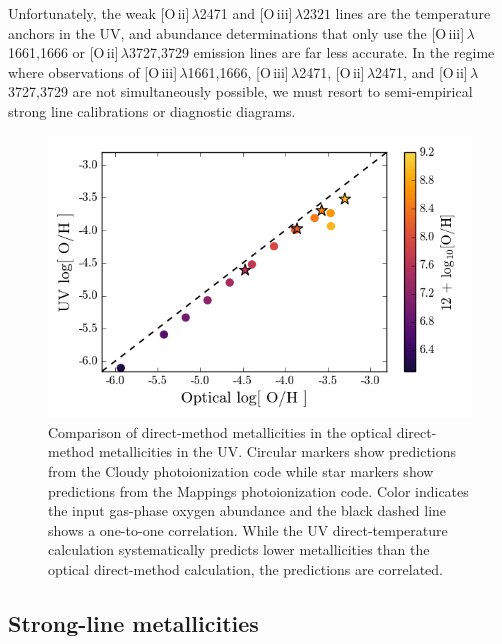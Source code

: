 \documentclass[preprint2]{aastex62}
\newcommand{\oiii}{[O\,{\sc iii}]\xspace}
\newcommand{\oii}{[O\,{\sc ii}]\xspace}
\begin{document}
Unfortunately, the weak \oii$\,\lambda$2471 and \oiii$\,\lambda2321$ lines are the temperature anchors in the UV, and abundance determinations that only use the \oiii$\,\lambda$1661,1666 or \oii$\,\lambda$3727,3729 emission lines are far less accurate. In the regime where observations of  \oiii$\,\lambda$1661,1666, \oiii$\,\lambda$2471, \oii$\,\lambda$2471, and \oii$\,\lambda$3727,3729 are not simultaneously possible, we must resort to semi-empirical strong line calibrations or diagnostic diagrams.

\begin{figure}
  \begin{center}
    \includegraphics[width=\linewidth]{figs/f1.png}
    \caption{Comparison of direct-method metallicities in the optical direct-method metallicities in the UV. Circular markers show predictions from the Cloudy photoionization code while star markers show predictions from the Mappings photoionization code. Color indicates the input gas-phase oxygen abundance and the black dashed line shows a one-to-one correlation. While the UV direct-temperature calculation systematically predicts lower metallicities than the optical direct-method calculation, the predictions are correlated.}
    \label{fig:UVoptZ}
  \end{center}
\end{figure}

\subsection{Strong-line metallicities}
\end{document}
